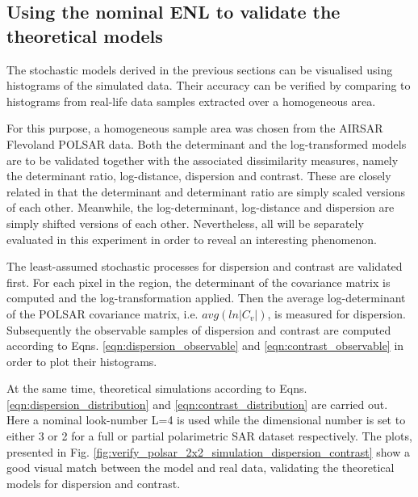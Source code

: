 \documentclass[journal]{IEEEtran}
\begin{document}

\subsection{Using the nominal ENL to validate the theoretical models} 
\label{sec:valid_nominal_enl}

The stochastic models derived in the previous sections can be visualised  using histograms of the simulated data.
Their accuracy can be verified by comparing to  histograms from real-life data samples extracted over a homogeneous area.

For this purpose, a homogeneous sample area was chosen from the AIRSAR Flevoland POLSAR data.
Both the determinant and the log-transformed models are to be validated together with the associated dissimilarity measures, namely the determinant ratio, log-distance, dispersion and contrast.
These are closely related in that the determinant and determinant ratio are simply scaled versions of each other.
Meanwhile, the log-determinant, log-distance and dispersion are simply shifted versions of each other.
Nevertheless, all will be separately evaluated in this experiment in order to reveal an interesting phenomenon.

The least-assumed stochastic processes for dispersion and contrast are validated first.
For each pixel in the region, the determinant of the covariance matrix is computed and the log-transformation applied.
Then the average log-determinant of the POLSAR covariance matrix, i.e. $avg(ln|C_v|)$, is measured for dispersion.
Subsequently the observable samples of dispersion and contrast are computed according to Eqns. \ref{eqn:dispersion_observable} and \ref{eqn:contrast_observable} in order to plot their histograms.

At the same time, theoretical simulations according to Eqns. \ref{eqn:dispersion_distribution} and \ref{eqn:contrast_distribution} are carried out.
Here a nominal look-number L=4 is used
  while the dimensional number is set to either 3 or 2 for a full or partial polarimetric SAR dataset respectively.
The plots, presented in Fig.
  \ref {fig:verify_polsar_2x2_simulation_dispersion_contrast} show a good  visual match between the model and real data, validating the theoretical models for dispersion and contrast.
  
\end{document}
